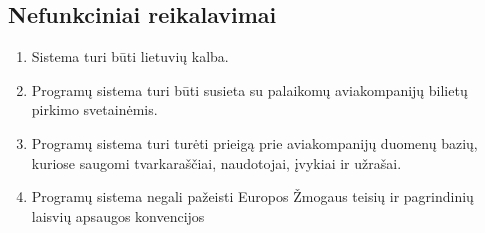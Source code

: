 \documentclass{VUMIFPSkursinis}
\begin{document}
            \subsection{Nefunkciniai reikalavimai}
                \begin{enumerate}[label=\textbf{NFR\arabic*}.]
                	\subsubsection{Bendri sistemos nefunkciniai reikalavimai}
                		\item \label{lokalizacija} Sistema turi būti lietuvių kalba.
                		\item Programų sistema turi būti susieta su palaikomų aviakompanijų bilietų pirkimo svetainėmis.
                		\item \label{avia_db} Programų sistema turi turėti prieigą prie aviakompanijų duomenų bazių, kuriose saugomi tvarkaraščiai, naudotojai, įvykiai ir užrašai.
                		\item Programų sistema negali pažeisti Europos Žmogaus teisių ir pagrindinių laisvių apsaugos konvencijos

\end{enumerate}
\end{document}
